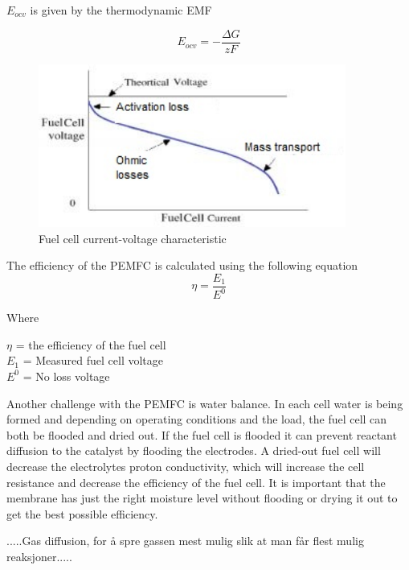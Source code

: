 $E_{ocv}$ is given by the thermodynamic EMF

\begin{equation}
    E_{ocv} = - \frac{\Delta G}{zF}
\end{equation}


\begin{figure}[ht]
    \centering
    \includegraphics[width=0.9\textwidth]{DIV./Bilder/Assembly/losses.jpg}
    \caption{Fuel cell current-voltage characteristic}
    \label{fig:Fuel cell current-voltage characteristic}
\end{figure}

The efficiency of the PEMFC is calculated using the following equation
\begin{equation}
    \eta =  \frac{E_1}{E^0}
\end{equation}

Where
\begin{center}
$\eta$ = the efficiency of the fuel cell \\
$E_1$ = Measured fuel cell voltage \\
$E^0$ = No loss voltage    
\end{center}

Another challenge with the PEMFC is water balance. In each cell water is being formed and depending on operating conditions and the load, the fuel cell can both be flooded and dried out. If the fuel cell is flooded it can prevent reactant diffusion to the catalyst by flooding the electrodes. A dried-out fuel cell will decrease the electrolytes proton conductivity, which will increase the cell resistance and decrease the efficiency of the fuel cell. It is important that the membrane has just the right moisture level without flooding or drying it out to get the best possible efficiency.

.....Gas diffusion, for å spre gassen mest mulig slik at man får flest mulig reaksjoner.....

